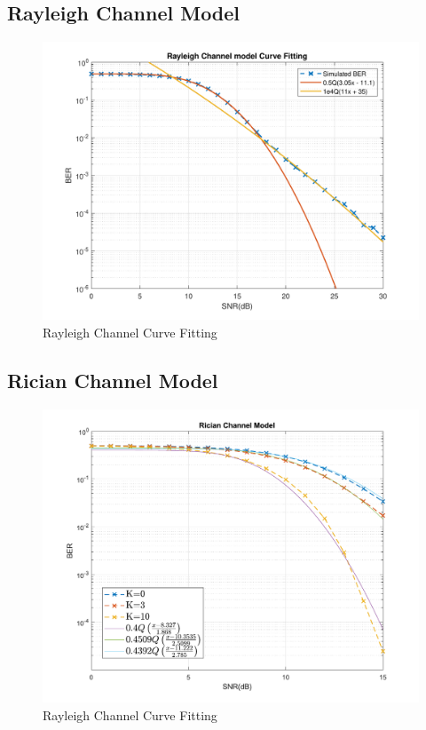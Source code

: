 \subsection{Rayleigh Channel Model}
\begin{figure}[htpb!]
	\centering
	\includegraphics[scale=0.7]{Graphics/Methodology/RaylCurveFit.pdf}
	\caption{Rayleigh Channel Curve Fitting}
	\label{fig:gaussCurveFit}
\end{figure}

\subsection{Rician Channel Model}
\begin{figure}[htpb!]
	\centering
	\includegraphics[scale=0.7]{Graphics/Methodology/RiceCurveFit.pdf}
	\caption{Rayleigh Channel Curve Fitting}
	\label{fig:gaussCurveFit}
\end{figure}

